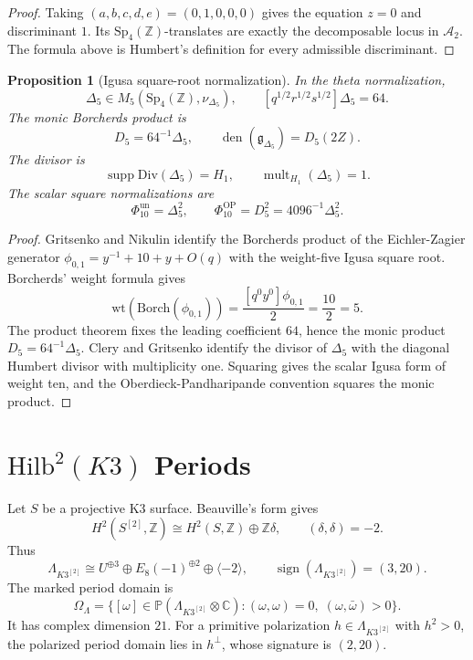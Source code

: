 \documentclass[11pt]{article}
\newtheorem{proposition}[theorem]{Proposition}
\providecommand{\C}{\mathbb{C}}
\providecommand{\Z}{\mathbb{Z}}
\providecommand{\PP}{\mathbb{P}}
\providecommand{\cA}{\mathcal{A}}
\providecommand{\fg}{\mathfrak{g}}
\providecommand{\Borch}{\mathrm{Borch}}
\providecommand{\Div}{\mathrm{Div}}
\providecommand{\Hilb}{\mathrm{Hilb}}
\providecommand{\Sp}{\mathrm{Sp}}
\providecommand{\wt}{\mathrm{wt}}
\providecommand{\Dfive}{\Delta_5}
\providecommand{\PhiTen}{\Phi_{10}}
\begin{document}
\begin{proof}
Taking \((a,b,c,d,e)=(0,1,0,0,0)\) gives the equation \(z=0\) and
discriminant \(1\).  Its \(\Sp_4(\Z)\)-translates are exactly the
decomposable locus in \(\cA_2\).  The formula above is Humbert's
definition for every admissible discriminant.
\end{proof}

\begin{proposition}[Igusa square-root normalization]
\label{prop:delta5-normalization}
In the theta normalization,
\[
  \Dfive\in M_5(\Sp_4(\Z),\nu_{\Dfive}),
  \qquad
  [q^{1/2}r^{1/2}s^{1/2}]\Dfive=64.
\]
The monic Borcherds product is
\[
  D_5=64^{-1}\Dfive,
  \qquad
  \operatorname{den}(\fg_{\Dfive})=D_5(2Z).
\]
The divisor is
\[
  \operatorname{supp}\Div(\Dfive)=H_1,
  \qquad
  \operatorname{mult}_{H_1}(\Dfive)=1.
\]
The scalar square normalizations are
\[
  \PhiTen^{\mathrm{un}}=\Dfive^2,
  \qquad
  \PhiTen^{\mathrm{OP}}=D_5^2=4096^{-1}\Dfive^2.
\]
\end{proposition}

\begin{proof}
Gritsenko and Nikulin identify the Borcherds product of the
Eichler-Zagier generator \(\phi_{0,1}=y^{-1}+10+y+O(q)\) with the
weight-five Igusa square root.  Borcherds' weight formula gives
\[
  \wt(\Borch(\phi_{0,1}))=\frac{[q^0y^0]\phi_{0,1}}{2}
  =\frac{10}{2}=5.
\]
The product theorem fixes the leading coefficient \(64\), hence the
monic product \(D_5=64^{-1}\Dfive\).  Clery and Gritsenko identify the
divisor of \(\Dfive\) with the diagonal Humbert divisor with
multiplicity one.  Squaring gives the scalar Igusa form of weight ten,
and the Oberdieck-Pandharipande convention squares the monic product.
\end{proof}

\section{\texorpdfstring{\(\Hilb^2(K3)\)}{Hilb2(K3)} Periods}

Let \(S\) be a projective K3 surface.  Beauville's form gives
\[
  H^2(S^{[2]},\Z)
  \cong
  H^2(S,\Z)\oplus\Z\delta,
  \qquad
  (\delta,\delta)=-2.
\]
Thus
\[
  \Lambda_{K3^{[2]}}
  \cong
  U^{\oplus 3}\oplus E_8(-1)^{\oplus 2}\oplus\langle -2\rangle,
  \qquad
  \operatorname{sign}(\Lambda_{K3^{[2]}})=(3,20).
\]
The marked period domain is
\[
  \Omega_{\Lambda}
  =
  \bigl\{[\omega]\in\PP(\Lambda_{K3^{[2]}}\otimes\C):
  (\omega,\omega)=0,\;(\omega,\bar\omega)>0\bigr\}.
\]
It has complex dimension \(21\).  For a primitive polarization
\(h\in\Lambda_{K3^{[2]}}\) with \(h^2>0\), the polarized period domain
lies in \(h^\perp\), whose signature is \((2,20)\).
\end{document}
